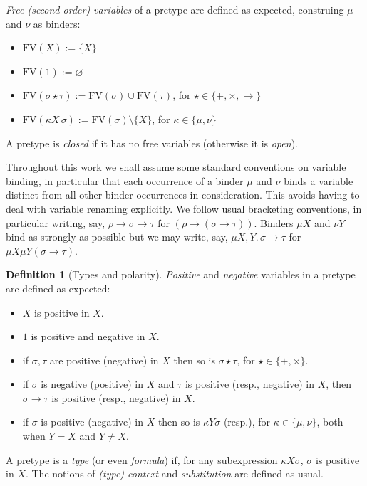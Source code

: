 \documentclass[10pt,a4paper]{amsart}
\theoremstyle{plain}
\theoremstyle{definition}
\newtheorem{defn}[defn]{Definition}
\renewcommand{\emptyset}{\varnothing}
\newcommand{\dfn}{:=}
\newcommand{\anupam}[1]{\todo[color=green]{A: #1}}
\renewcommand{\todo}[1]{}
\renewcommand{\anupam}[1]{}
\theoremstyle{plain}
\theoremstyle{definition} %
\newcommand{\FV}{\mathrm{FV}}
\newcommand{\fv}[1]{\FV(#1)}
\newcommand{\unit}{1}
\newcommand{\arrow}{\to}
\begin{document}
\emph{Free (second-order) variables} of a pretype are defined as expected, construing $\mu$ and $\nu$ as binders:
\begin{itemize}
    \item $\fv X \dfn \{X\}$
    \item $\fv \unit \dfn \emptyset$
    \item $\fv {\sigma \star \tau} \dfn \fv \sigma \cup \fv \tau$, for $\star \in \{+,\times,\arrow\}$
    \item $\fv{\kappa X \, \sigma} \dfn \fv \sigma \setminus \{X\}$, for $\kappa \in \{\mu,\nu\}$
\end{itemize}
A pretype is \emph{closed} if it has no free variables (otherwise it is \emph{open}).

Throughout this work we shall assume some standard conventions on variable binding, in particular that each occurrence of a binder $\mu$ and $\nu$ binds a variable distinct from all other binder occurrences in consideration.
This avoids having to deal with variable renaming explicitly.
We follow usual bracketing conventions, in particular writing, say, $\rho \arrow \sigma\arrow \tau$ for $(\rho \arrow (\sigma \arrow \tau))$.
Binders $\mu X $ and $\nu Y$ bind as strongly as possible but we may write, say, $\mu X, Y .\,  \sigma \to \tau$ for $\mu X \mu Y (\sigma \to \tau)$. 


\begin{defn}
    [Types and polarity]
    \emph{Positive} and \emph{negative} variables in a pretype are defined as expected:
\begin{itemize}     
\item $X$ is positive in $X$.
        \item $1$ is positive and negative in $X$.
        \item if $\sigma,\tau$ are positive (negative) in $X$ then so is $\sigma \star \tau$, for $\star \in \{+,\times\}$.
        \item if $\sigma$ is negative (positive) in $X$ and $\tau $ is positive (resp., negative) in $X$, then $\sigma \to \tau$ is positive (resp., negative) in $X$.
        \item if $\sigma$ is positive (negative) in $X$ then so is $\kappa Y \sigma$ (resp.), for $\kappa \in \{\mu,\nu\}$, both when $Y=X$ and $Y \neq X$.
    \end{itemize}
A pretype is a \emph{type} (or even \emph{formula}) if, for any subexpression $\kappa X \sigma$, $\sigma$ is positive in $X$.
The notions of \emph{(type) context} and \emph{substitution} are defined as usual. 
\end{defn}
\end{document}
